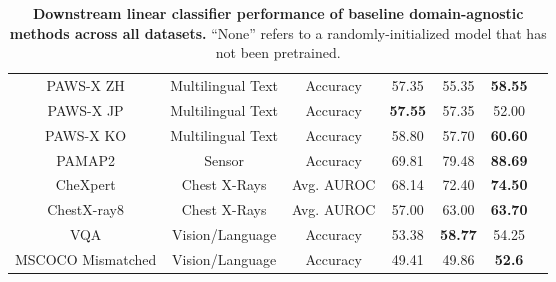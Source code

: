 \documentclass{article}
\begin{document}
\begin{table}
\begin{tabular}{ccccccc}
PAWS-X ZH  & Multilingual Text  & Accuracy  & 57.35 & 55.35 & \textbf{58.55}  \\
PAWS-X JP  & Multilingual Text  & Accuracy  & \textbf{57.55} & 57.35 & 52.00  \\
PAWS-X KO  & Multilingual Text  & Accuracy  & 58.80 & 57.70 & \textbf{60.60}  \\
PAMAP2           & Sensor   & Accuracy       & 69.81 & 79.48       & \textbf{88.69}  \\
CheXpert    & Chest X-Rays    & Avg. AUROC & 68.14 & 72.40 & \textbf{74.50}        \\
ChestX-ray8    & Chest X-Rays    & Avg. AUROC & 57.00 & 63.00 & \textbf{63.70}        \\
VQA              & Vision/Language & Accuracy & 53.38 & \textbf{58.77}       & 54.25  \\
MSCOCO Mismatched              & Vision/Language & Accuracy & 49.41 & 49.86       & \textbf{52.6}  \\
\bottomrule
\end{tabular}
\vspace{.2cm}
\caption{\textbf{Downstream linear classifier performance of baseline domain-agnostic methods across all datasets.} ``None'' refers to a randomly-initialized model that has not been pretrained.}
\label{table:results-all}
\end{table}
\end{document}
